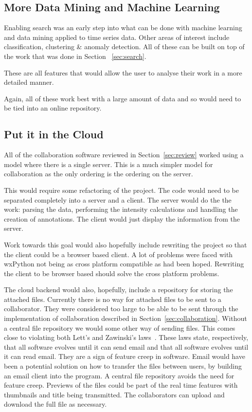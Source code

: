 \subsection{More Data Mining and Machine Learning}

Enabling search was an early step into what can be done with machine learning and data mining applied to time series data.  Other areas of interest include classification, clustering \& anomaly detection.  All of these can be built on top of the work that was done in Section ~\ref{sec:search}.

These are all features that would allow the user to analyse their work in a more detailed manner.

Again, all of these work best with a large amount of data and so would need to be tied into an online repository.

\subsection{Put it in the Cloud}
\label{sec:cloud}
All of the collaboration software reviewed in Section~\ref{sec:review} worked using a model where there is a single server.  This is a much simpler model for collaboration as the only ordering is the ordering on the server.

This would require some refactoring of the project.  The code would need to be separated completely into a server and a client.  The server would do the the work: parsing the data, performing the intensity calculations and handling the creation of annotations.  The client would just display the information from the server.

Work towards this goal would also hopefully include rewriting the project so that the client could be a browser based client.  A lot of problems were faced with wxPython not being as cross platform compatible as had been hoped.  Rewriting the client to be browser based should solve the cross platform problems.

The cloud backend would also, hopefully, include a repository for storing the attached files.  Currently there is no way for attached files to be sent to a collaborator.  They were considered too large to be able to be sent through the implementation of collaboration described in Section~\ref{sec:collaboration}.  Without a central file repository we would some other way of sending files.  This comes close to violating both Lett's and Zawinski's laws~\cite{atwood}.  These laws state, respectively, that all software evolves until it can send email and that all software evolves until it can read email.  They are a sign of feature creep in software.  Email would have been a potential solution on how to transfer the files between users, by building an email client into the program.  A central file repository avoids the need for feature creep.  Previews of the files could be part of the real time features with thumbnails and title being transmitted.  The collaborators can upload and download the full file as necessary.

